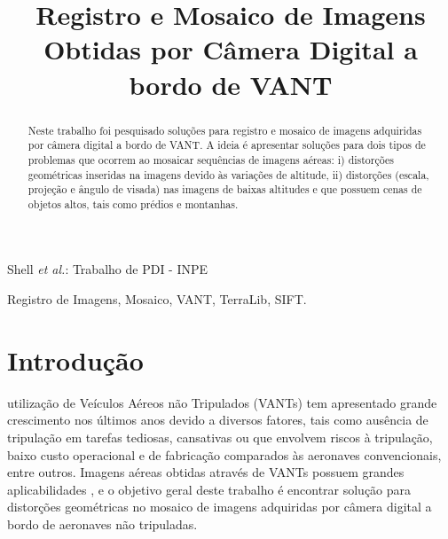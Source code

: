 \documentclass[9pt, a4paper, nofonttune, journal]{IEEEtran}
\begin{document}
\title{Registro e Mosaico de Imagens \\Obtidas por Câmera Digital a bordo de VANT}

\author{
}

%
{Shell \MakeLowercase{\textit{et al.}}: Trabalho de PDI - INPE}

\maketitle

\begin{abstract}
Neste trabalho foi pesquisado soluções para registro e mosaico de imagens adquiridas por câmera digital a bordo de VANT. A ideia é apresentar soluções para dois tipos de problemas que ocorrem ao mosaicar sequências de imagens aéreas: i) distorções geométricas inseridas na imagens devido às variações de altitude, ii) distorções (escala, projeção e ângulo de visada) nas imagens de baixas altitudes e que possuem cenas de objetos altos, tais como prédios e montanhas.
\end{abstract}

\begin{IEEEkeywords}
Registro de Imagens, Mosaico, VANT, TerraLib, SIFT.
\end{IEEEkeywords}

\section{Introdução}
 utilização de Veículos Aéreos não Tripulados (VANTs) tem apresentado grande crescimento nos últimos anos devido a diversos fatores, tais como ausência de tripulação em tarefas tediosas, cansativas ou que envolvem riscos à tripulação, baixo custo operacional e de fabricação comparados às aeronaves convencionais, entre outros. Imagens aéreas obtidas através de VANTs possuem grandes aplicabilidades \cite{canhoto}, e o objetivo geral deste trabalho é encontrar solução para distorções geométricas no mosaico de imagens adquiridas por câmera digital a bordo de aeronaves não tripuladas.
\end{document}
